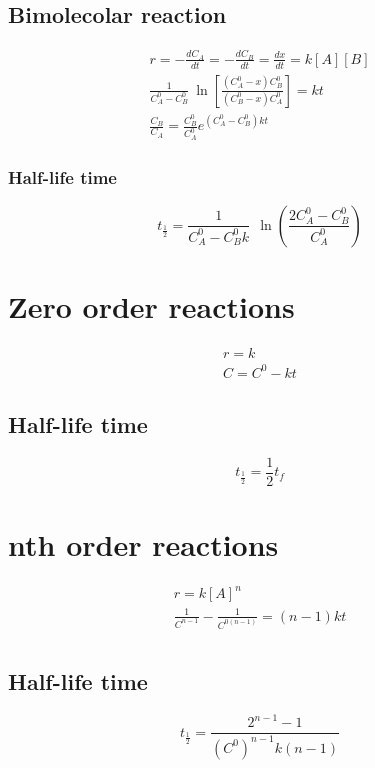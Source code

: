 \documentclass[../Master.tex]{subfiles}
\begin{document}
\begin{multicols*}{2}
		  \subsection{Bimolecolar reaction}
				   \begin{gather*}
						    r = - \frac{dC_{A}}{dt} = - \frac{dC_{B}}{dt} = \frac{dx}{dt} = k[A][B] \\
						    \frac{1}{C_{A} ^{0} - C_{B} ^{0} }~\ln\left[\frac{(C_{A} ^{0} - x)C_{B} ^{0} }{(C_{B} ^{0} - x) C_{A} ^{0} }\right] = kt\\
						    \frac{C_{B}}{C_{A}} = \frac{C_{B} ^{0} }{C_{A} ^{0} }e^{(C_{A} ^{0}-C_{B} ^{0}  )kt}
				   \end{gather*}

				   \subsubsection{Half-life time}
						    \[
								     t_{\frac{1}{2}} = \frac{1}{C_{A} ^{0} - C_{B} ^{0} k}~ ~  \ln\left(  \frac{2C_{A} ^{0} - C_{B}^{0} }{C_{A}^{0}} \right)
						    \]

		 \section{Zero order reactions}
		  \begin{gather*}
				   r = k\\
				   C = C^0 - kt
		  \end{gather*}
		  \subsection{Half-life time}
				   \[
						    t_{\frac{1}{2}}  = \frac{1}{2}t_{f}
				   \]
		 \section{nth order reactions}
		  \begin{gather*}
				   r = {k[A]^{n}} \\
				   \frac{1}{C^{n-1} } - \frac{1}{C^{0(n-1 )} } = (n-1)kt\\
		  \end{gather*}
		  \subsection{Half-life time}
				   \[
						    t_{\frac{1}{2}} = \frac{2^{n-1} -1 }{(C^{0} )^{n-1} k(n-1)}
				   \]


\end{multicols*}
\end{document}
